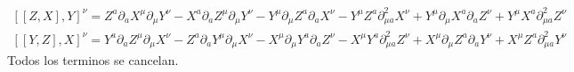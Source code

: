 \documentclass{article}
\begin{document}
\begin{enumerate}
\[\begin{gathered}
    [[Z,X],Y]^{\nu}    = Z^a \partial_a X^{\mu} \partial_{\mu} Y^{\nu} - X^a \partial_a Z^{\mu} \partial_{\mu} Y^{\nu} - Y^{\mu} \partial_{\mu} Z^a \partial_a X^{\nu} - Y^{\mu} Z^a \partial^2_{\mu a} X^{\nu} + Y^{\mu} \partial_{\mu} X^a \partial_a Z^{\nu} + Y^{\mu} X^a \partial^2_{\mu a} Z^{\nu} \\
    [[Y,Z],X]^{\nu}    = Y^a \partial_a Z^{\mu} \partial_{\mu} X^{\nu} - Z^a \partial_a Y^{\mu} \partial_{\mu} X^{\nu} - X^{\mu} \partial_{\mu} Y^a \partial_a Z^{\nu} - X^{\mu} Y^a \partial^2_{\mu a} Z^{\nu} + X^{\mu} \partial_{\mu} Z^a \partial_a Y^{\nu} + X^{\mu} Z^a \partial^2_{\mu a} Y^{\nu} 
\end{gathered}
\]
Todos los terminos se cancelan.

\end{enumerate}
\end{document}
